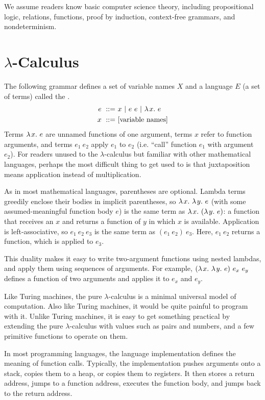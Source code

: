 We assume readers know basic computer science theory, including propositional logic, relations, functions, proof by induction, context-free grammars, and nondeterminism.

\section{$\lambda$-Calculus}

The following grammar defines a set of variable names $X$ and a language $E$ (a set of terms) called the .
\begin{equation}
\begin{aligned}
	e\ ::=&\ x\ |\ e~e\ |\ \lambda\mspace{2mu}{x}\ldotp\, e \\
	x\ ::=&\ \text{[variable names]}
\end{aligned}
\end{equation}
Terms $\lambda\mspace{2mu}{x}\ldotp\, e$ are unnamed functions of one argument, terms $x$ refer to function arguments, and terms $e_1~e_2$ apply $e_1$ to $e_2$ (i.e. ``call'' function $e_1$ with argument $e_2$).
For readers unused to the $\lambda$-calculus but familiar with other mathematical languages, perhaps the most difficult thing to get used to is that juxtaposition means application instead of multiplication.

As in most mathematical languages, parentheses are optional.
Lambda terms greedily enclose their bodies in implicit parentheses, so $\lambda\mspace{2mu}{x}\ldotp\,\lambda\mspace{2mu}{y}\ldotp\, e$ (with some assumed-meaningful function body $e$) is the same term as $\lambda\mspace{2mu}{x}\ldotp\,(\lambda\mspace{2mu}{y}\ldotp\, e)$: a function that receives an $x$ and returns a function of $y$ in which $x$ is available.
Application is left-associative, so $e_1~e_2~e_3$ is the same term as $(e_1~e_2)~e_3$.
Here, $e_1~e_2$ returns a function, which is applied to $e_3$.

This duality makes it easy to write two-argument functions using nested lambdas, and apply them using sequences of arguments.
For example, $(\lambda\mspace{2mu}{x}\ldotp\, \lambda\mspace{2mu}{y}\ldotp\, e)~e_x~e_y$ defines a function of two arguments and applies it to $e_x$ and $e_y$.

Like Turing machines, the pure $\lambda$-calculus is a minimal universal model of computation.
Also like Turing machines, it would be quite painful to program with it.
Unlike Turing machines, it is easy to get something practical by extending the pure $\lambda$-calculus with values such as pairs and numbers, and a few primitive functions to operate on them.

In most programming languages, the language implementation defines the meaning of function calls.
Typically, the implementation pushes arguments onto a stack, copies them to a heap, or copies them to registers.
It then stores a return address, jumps to a function address, executes the function body, and jumps back to the return address.

